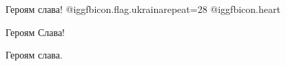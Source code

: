 Героям слава! 
@igg{fbicon.flag.ukraina}{repeat=28}
@igg{fbicon.heart}

 
Героям Слава!

 
Героям слава.

